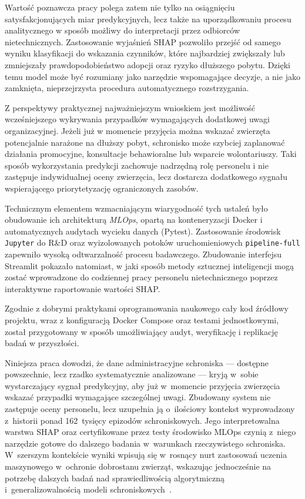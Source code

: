 
Wartość poznawcza pracy polega zatem nie tylko na osiągnięciu satysfakcjonujących miar predykcyjnych, lecz także na uporządkowaniu procesu analitycznego w sposób możliwy do interpretacji przez odbiorców nietechnicznych. Zastosowanie wyjaśnień SHAP pozwoliło przejść od samego wyniku klasyfikacji do wskazania czynników, które najbardziej zwiększały lub zmniejszały prawdopodobieństwo adopcji oraz ryzyko dłuższego pobytu. Dzięki temu model może być rozumiany jako narzędzie wspomagające decyzje, a nie jako zamknięta, nieprzejrzysta procedura automatycznego rozstrzygania.

Z perspektywy praktycznej najważniejszym wnioskiem jest możliwość wcześniejszego wykrywania przypadków wymagających dodatkowej uwagi organizacyjnej. Jeżeli już w momencie przyjęcia można wskazać zwierzęta potencjalnie narażone na dłuższy pobyt, schronisko może szybciej zaplanować działania promocyjne, konsultacje behawioralne lub wsparcie wolontariuszy. Taki sposób wykorzystania predykcji zachowuje nadrzędną rolę personelu i nie zastępuje indywidualnej oceny zwierzęcia, lecz dostarcza dodatkowego sygnału wspierającego priorytetyzację ograniczonych zasobów.

Technicznym elementem wzmacniającym wiarygodność tych ustaleń było obudowanie ich architekturą \emph{MLOps}, opartą na konteneryzacji Docker i automatycznych audytach wycieku danych (Pytest). Zastosowanie środowisk \texttt{Jupyter} do R\&D oraz wyizolowanych potoków uruchomieniowych \texttt{pipeline-full} zapewniło wysoką odtwarzalność procesu badawczego. Zbudowanie interfejsu Streamlit pokazało natomiast, w jaki sposób metody sztucznej inteligencji mogą zostać wprowadzone do codziennej pracy personelu nietechnicznego poprzez interaktywne raportowanie wartości SHAP.

Zgodnie z dobrymi praktykami oprogramowania naukowego cały kod źródłowy projektu, wraz z konfiguracją Docker Compose oraz testami jednostkowymi, został przygotowany w sposób umożliwiający audyt, weryfikację i replikację badań w przyszłości.

Niniejsza praca dowodzi, że dane administracyjne schroniska --- dostępne powszechnie, lecz rzadko systematycznie analizowane --- kryją w~sobie wystarczający sygnał predykcyjny, aby już w~momencie przyjęcia zwierzęcia wskazać przypadki wymagające szczególnej uwagi. Zbudowany system nie zastępuje oceny personelu, lecz uzupełnia ją o~ilościowy kontekst wyprowadzony z~historii ponad 162~tysięcy epizodów schroniskowych. Jego interpretowalna warstwa SHAP oraz certyfikowane przez testy środowisko MLOps czynią z~niego narzędzie gotowe do dalszego badania w~warunkach rzeczywistego schroniska. W~szerszym kontekście wyniki wpisują się w~rosnący nurt zastosowań uczenia maszynowego w~ochronie dobrostanu zwierząt, wskazując jednocześnie na potrzebę dalszych badań nad sprawiedliwością algorytmiczną i~generalizowalnością modeli schroniskowych~\cite{Bradley2021}.
